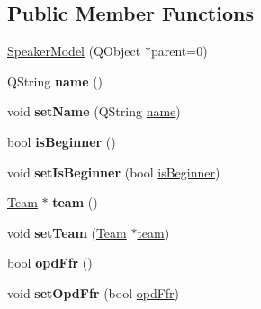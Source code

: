 \subsection*{Public Member Functions}
\begin{DoxyCompactItemize}
\item 
\hyperlink{classSpeakerModel_ab277204d896886103f137109b73b961c}{Speaker\-Model} (Q\-Object $\ast$parent=0)
\item 
\hypertarget{classSpeakerModel_a5f62e57052d36ba5f9880882b7a9f4ce}{Q\-String {\bfseries name} ()}\label{classSpeakerModel_a5f62e57052d36ba5f9880882b7a9f4ce}

\item 
\hypertarget{classSpeakerModel_a3045b71845e7a6ecb80f841718456873}{void {\bfseries set\-Name} (Q\-String \hyperlink{classSpeakerModel_a9727f89c2cc146a2d9959d2e692aa444}{name})}\label{classSpeakerModel_a3045b71845e7a6ecb80f841718456873}

\item 
\hypertarget{classSpeakerModel_ac6d6756ae85dc6a2546f18a6e71be095}{bool {\bfseries is\-Beginner} ()}\label{classSpeakerModel_ac6d6756ae85dc6a2546f18a6e71be095}

\item 
\hypertarget{classSpeakerModel_a430365a8afbd64138df99d6908d23334}{void {\bfseries set\-Is\-Beginner} (bool \hyperlink{classSpeakerModel_a47d41be22317dd22fd7aec6240c731cf}{is\-Beginner})}\label{classSpeakerModel_a430365a8afbd64138df99d6908d23334}

\item 
\hypertarget{classSpeakerModel_ac93f7de21450d6bd752890e1e5eeab99}{\hyperlink{classTeam}{Team} $\ast$ {\bfseries team} ()}\label{classSpeakerModel_ac93f7de21450d6bd752890e1e5eeab99}

\item 
\hypertarget{classSpeakerModel_a014f31674707368294e6c3ab067447c3}{void {\bfseries set\-Team} (\hyperlink{classTeam}{Team} $\ast$\hyperlink{classSpeakerModel_a2b6725ebf62712e76c559443426144b1}{team})}\label{classSpeakerModel_a014f31674707368294e6c3ab067447c3}

\item 
\hypertarget{classSpeakerModel_a2bc33b0ddaa652b0e5a000aa67a490d7}{bool {\bfseries opd\-Ffr} ()}\label{classSpeakerModel_a2bc33b0ddaa652b0e5a000aa67a490d7}

\item 
\hypertarget{classSpeakerModel_ae9110f97c46ec0370feb137e7eda015a}{void {\bfseries set\-Opd\-Ffr} (bool \hyperlink{classSpeakerModel_ae7ddef47cf54a9ace7c2399c7a18049d}{opd\-Ffr})}\label{classSpeakerModel_ae9110f97c46ec0370feb137e7eda015a}


\end{DoxyCompactItemize}
